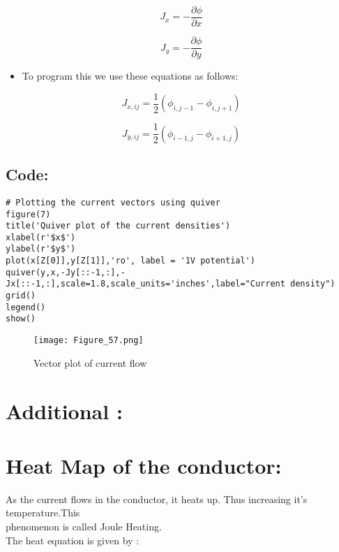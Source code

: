 \documentclass[11pt, a4paper, twoside]{article}
\begin{document}
\begin{equation}
    J_x = -\frac{\partial \phi}{\partial x} 
  \end{equation}

\begin{equation}
    J_y = -\frac{\partial \phi}{\partial y} 
  \end{equation}

\begin{itemize}
\item
  To program this we use these equations as follows:
\end{itemize}

\begin{equation}
        J_{x,ij} = \frac{1}{2}(\phi_{i,j-1} - \phi_{i,j+1}) 
    \end{equation}

\begin{equation}
        J_{y,ij} = \frac{1}{2}(\phi_{i-1,j} - \phi_{i+1,j}) 
    \end{equation}
  
 \subsection*{Code:}
\begin{verbatim}
# Plotting the current vectors using quiver
figure(7) 
title('Quiver plot of the current densities')
xlabel(r'$x$')
ylabel(r'$y$')
plot(x[Z[0]],y[Z[1]],'ro', label = '1V potential')
quiver(y,x,-Jy[::-1,:],-Jx[::-1,:],scale=1.8,scale_units='inches',label="Current density")
grid()
legend()
show()   
\end{verbatim}

  \begin{figure}[!tbh]
   \centering
   \texttt{[image: Figure\_57.png]}  
   \caption{Vector plot of current flow}
  \end{figure}



 \section*{Additional :\\\\Heat Map of the conductor:}

As the current flows in the conductor, it heats up. Thus increasing it's
temperature.This \\phenomenon is called Joule Heating.
\\The heat equation is given by :
\end{document}
